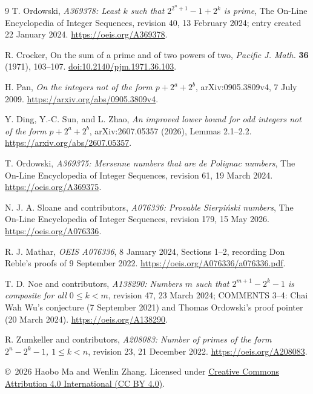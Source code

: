 \documentclass[11pt]{article}
\begin{document}
\begin{thebibliography}{9}
 T. Ordowski,
\emph{A369378: Least $k$ such that $2^{2^n+1}-1+2^k$ is prime},
The On-Line Encyclopedia of Integer Sequences, revision 40,
13 February 2024; entry created 22 January 2024.
\url{https://oeis.org/A369378}.

 R. Crocker,
On the sum of a prime and of two powers of two,
\emph{Pacific J. Math.} \textbf{36} (1971), 103--107.
\href{https://doi.org/10.2140/pjm.1971.36.103}{doi:10.2140/pjm.1971.36.103}.

 H. Pan,
\emph{On the integers not of the form $p+2^a+2^b$},
arXiv:0905.3809v4, 7 July 2009.
\url{https://arxiv.org/abs/0905.3809v4}.

 Y. Ding, Y.-C. Sun, and L. Zhao,
\emph{An improved lower bound for odd integers not of the form $p+2^a+2^b$},
arXiv:2607.05357 (2026), Lemmas 2.1--2.2.
\url{https://arxiv.org/abs/2607.05357}.

 T. Ordowski,
\emph{A369375: Mersenne numbers that are de Polignac numbers},
The On-Line Encyclopedia of Integer Sequences, revision 61,
19 March 2024. \url{https://oeis.org/A369375}.

 N. J. A. Sloane and contributors,
\emph{A076336: Provable Sierpi\'nski numbers},
The On-Line Encyclopedia of Integer Sequences, revision 179,
15 May 2026. \url{https://oeis.org/A076336}.

 R. J. Mathar, \emph{OEIS A076336},
8 January 2024, Sections 1--2, recording Don Reble's proofs of
9 September 2022. \url{https://oeis.org/A076336/a076336.pdf}.

 T. D. Noe and contributors,
\emph{A138290: Numbers $m$ such that $2^{m+1}-2^k-1$ is composite
for all $0\leq k<m$}, revision 47, 23 March 2024;
COMMENTS 3--4: Chai Wah Wu's conjecture (7 September 2021)
and Thomas Ordowski's proof pointer (20 March 2024).
\url{https://oeis.org/A138290}.

 R. Zumkeller and contributors,
\emph{A208083: Number of primes of the form $2^n-2^k-1$, $1\leq k<n$},
revision 23, 21 December 2022. \url{https://oeis.org/A208083}.
\end{thebibliography}
\medskip\noindent\small
\copyright\ 2026 Haobo Ma and Wenlin Zhang.
Licensed under \href{https://creativecommons.org/licenses/by/4.0/}{Creative Commons Attribution 4.0 International (CC BY 4.0)}.
\end{document}
